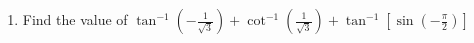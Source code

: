 \documentclass{article}
\begin{document}
 \begin{enumerate}
	 \item Find the value of $\tan^{-1} (-\frac{1}{\sqrt{3}}) + \cot^{-1}(\frac{1}{\sqrt{3}}) + \tan^{-1}[\sin(-\frac{\pi}{2})]$
 \end{enumerate}
 
\end{document}
